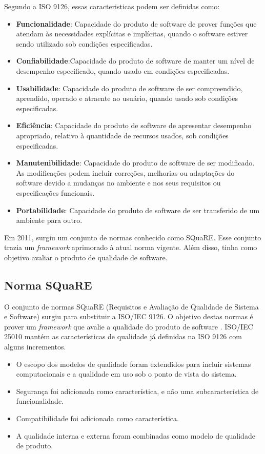 Segundo a ISO 9126, essas caracteristicas podem ser definidas como:
\begin{itemize}
\item \textbf{Funcionalidade}: Capacidade do produto de software de prover funções que atendam às necessidades explícitas e implícitas, quando o software estiver sendo utilizado sob condições especificadas.
\item \textbf{Confiabilidade}:Capacidade do produto de software de manter um nível de desempenho especificado, quando usado em condições especificadas.
\item \textbf{Usabilidade}: Capacidade do produto de software de ser compreendido, aprendido, operado e atraente ao usuário, quando usado sob condições especificadas.
\item \textbf{Eficiência}: Capacidade do produto de software de apresentar desempenho apropriado, relativo à quantidade de recursos usados, sob condições especificadas.
\item \textbf{Manutenibilidade}: Capacidade do produto de software de ser modificado. As modificações podem incluir correções, melhorias ou adaptações do software devido a mudanças no ambiente e nos seus requisitos ou especificações funcionais.
\item \textbf{Portabilidade}: Capacidade do produto de software de ser transferido de um ambiente para outro.
\end{itemize}

Em 2011, surgiu um conjunto de normas conhecido como SQuaRE. Esse conjunto trazia um \textit{framework} aprimorado à atual norma vigente. Além disso, tinha como objetivo avaliar o produto de qualidade de software.

\subsection{Norma SQuaRE}
O conjunto de normas SQuaRE (Requisitos e Avaliação de Qualidade de Sistema e Software) surgiu para substituir a ISO/IEC 9126. O objetivo destas normas é prover um \textit{framework} que avalie a qualidade do produto de software \cite{luiza_yago}. ISO/IEC 25010 mantém as características de qualidade já definidas na ISO 9126 com alguns incrementos.

\begin{itemize}
\item O escopo dos modelos de qualidade foram extendidos para incluir sistemas computacionais e a qualidade em uso sob o ponto de vista do sistema.
\item Segurança foi adicionada como característica, e não uma subcaracterística de funcionalidade.
\item Compatibilidade foi adicionada como característica.
\item A qualidade interna e externa foram combinadas como modelo de qualidade de produto.
\end{itemize}

